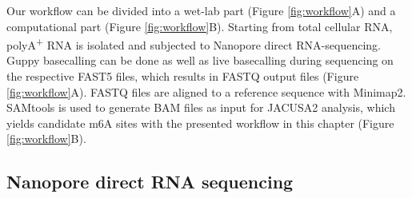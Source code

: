 \documentclass[times, 11pt, a4paper]{article}
\begin{document}
Our workflow can be divided into a wet-lab part (Figure \ref{fig:workflow}A) and a computational part (Figure \ref{fig:workflow}B). Starting from total cellular RNA, polyA\textsuperscript{+} RNA is isolated and subjected to Nanopore direct RNA-sequencing. Guppy basecalling can be done as well as live basecalling during sequencing on the respective FAST5 files, which results in FASTQ output files (Figure \ref{fig:workflow}A). FASTQ files are aligned to a reference sequence with Minimap2. SAMtools is used to generate BAM files as input for JACUSA2 analysis, which yields candidate m6A sites with the presented workflow in this chapter (Figure \ref{fig:workflow}B).


\subsection*{Nanopore direct RNA sequencing}
\end{document}
